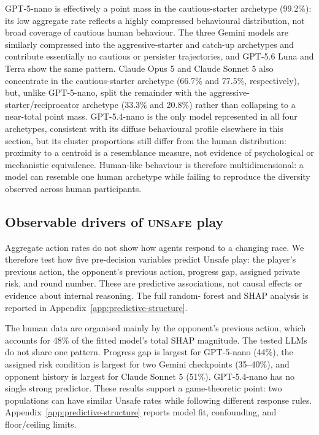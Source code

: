 \documentclass[sigconf]{aamas}
\newcommand{\Unsafe}{\textsc{unsafe}}
\begin{document}
GPT-5-nano is effectively a point mass in the cautious-starter archetype
(99.2\%): its low aggregate rate reflects a highly compressed behavioural
distribution, not broad coverage of cautious human behaviour. The three
Gemini models are similarly compressed into the aggressive-starter and
catch-up archetypes and contribute essentially no cautious or persister
trajectories, and GPT-5.6 Luna and Terra show the same pattern. Claude
Opus 5 and Claude Sonnet 5 also
concentrate in the cautious-starter archetype (66.7\% and 77.5\%,
respectively), but, unlike GPT-5-nano, split the remainder with the
aggressive-starter/reciprocator archetype (33.3\% and 20.8\%) rather than
collapsing to a near-total point mass. GPT-5.4-nano is the only model
represented in all four
archetypes, consistent with its diffuse behavioural profile elsewhere in
this section, but its cluster proportions still differ from the human
distribution: proximity to a centroid is a resemblance measure, not
evidence of psychological or mechanistic equivalence. Human-like behaviour
is therefore multidimensional: a model can resemble one human
archetype while failing to reproduce the diversity observed across human
participants.

\subsection{Observable drivers of \Unsafe{} play}
\label{sec:results-shap}

Aggregate action rates do not show how agents respond to a changing race.
We therefore test how five pre-decision variables predict Unsafe play: the
player's previous action, the opponent's previous action, progress gap,
assigned private risk, and round number. These are predictive associations,
not causal effects or evidence about internal reasoning. The full random-
forest and SHAP analysis is reported in Appendix~\ref{app:predictive-structure}.

The human data are organised mainly by the opponent's previous action, which
accounts for 48\% of the fitted model's total SHAP magnitude. The tested LLMs
do not share one pattern. Progress gap is largest for GPT-5-nano (44\%), the
assigned risk condition is largest for two Gemini checkpoints (35--40\%), and
opponent history is largest for Claude Sonnet 5 (51\%). GPT-5.4-nano has no
single strong predictor. These results support a game-theoretic point: two
populations can have similar Unsafe rates while following different response
rules. Appendix~\ref{app:predictive-structure} reports model fit, confounding,
and floor/ceiling limits.
\end{document}
